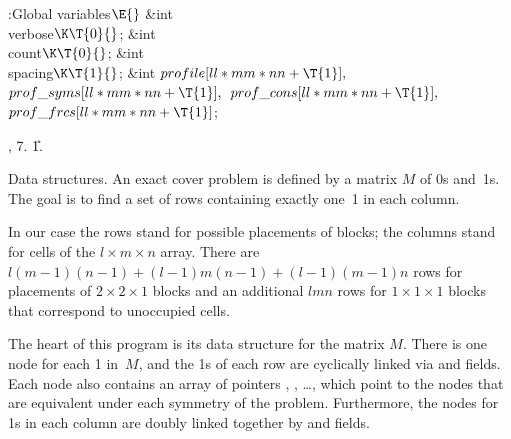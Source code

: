 \B{}:Global variables\X${}\E{}$\6
\&{int} \\{verbose}${}\K\T{0}{}$;\6
\&{int} \\{count}${}\K\T{0}{}$;\6
\&{int} \\{spacing}${}\K\T{1}{}$;\6
\&{int} ${}\\{profile}[\\{ll}*\\{mm}*\\{nn}+\T{1}],{}$ ${}\\{prof\_syms}[%
\\{ll}*\\{mm}*\\{nn}+\T{1}],{}$ ${}\\{prof\_cons}[\\{ll}*\\{mm}*\\{nn}+%
\T{1}],{}$ ${}\\{prof\_frcs}[\\{ll}*\\{mm}*\\{nn}+\T{1}]{}$;\par
{}, 7.
\U1.\fi

Data structures. An exact cover problem is defined by
a matrix $M$ of 0s
and~1s. The goal is to find a set of rows containing exactly one~1 in each
column.

In our case the rows stand for possible placements of blocks; the
columns stand for cells of the $l\times m\times n$ array. There are
$l(m-1)(n-1)+(l-1)m(n-1)+(l-1)(m-1)n$ rows for placements of $2\times2\times1$
blocks and an additional $lmn$ rows for $1\times1\times1$ blocks that
correspond to unoccupied cells.

The heart of this program is its data structure for the matrix $M$. There is
one node for each 1 in~$M$, and the 1s of each row are cyclically linked via
 and  fields. Each node also contains an array of
pointers
, , \dots, which point to the nodes that
are equivalent under
each symmetry of the problem. Furthermore, the nodes for 1s in each column are
doubly linked together by  and  fields.

